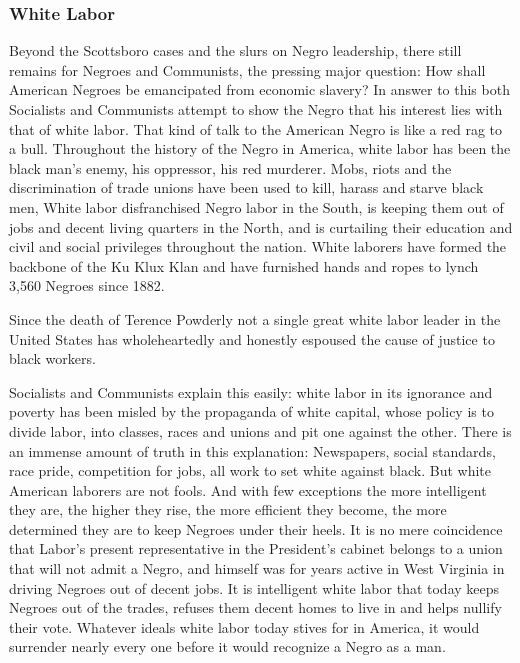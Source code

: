 \documentclass[letterpaper,10pt,english]{jupyterBook}
\begin{document}
\subsubsection{White Labor}
\label{\detokenize{Volumes/38/09/negro_and_communism:white-labor}}
\sphinxAtStartPar
Beyond the Scottsboro cases and the slurs on Negro leadership, there still remains for Negroes and Communists, the pressing major question: How shall American Negroes be emancipated from economic slavery? In answer to this both Socialists and Communists attempt to show the Negro that his interest lies with that of white labor. That kind of talk to the American Negro is like a red rag to a bull. Throughout the history of the Negro in America, white labor has been the black man’s enemy, his oppressor, his red murderer. Mobs, riots and the discrimination of trade unions have been used to kill, harass and starve black men, White labor disfranchised Negro labor in the South, is keeping them out of jobs and decent living quarters in the North, and is curtailing their education and civil and social privileges throughout the nation. White laborers have formed the backbone of the Ku Klux Klan and have furnished hands and ropes to lynch 3,560 Negroes since 1882.

\sphinxAtStartPar
Since the death of Terence Powderly not a single great white labor leader in the United States has wholeheartedly and honestly espoused the cause of justice to black workers.

\sphinxAtStartPar
Socialists and Communists explain this easily: white labor in its ignorance and poverty has been misled by the propaganda of white capital, whose policy is to divide labor, into classes, races and unions and pit one against the other. There is an immense amount of truth in this explanation: Newspapers, social standards, race pride, competition for jobs, all work to set white against black. But white American laborers are not fools. And with few exceptions the more intelligent they are, the higher they rise, the more efficient they become, the more determined they are to keep Negroes under their heels. It is no mere coincidence that Labor’s present representative in the President’s cabinet belongs to a union that will not admit a Negro, and himself was for years active in West Virginia in driving Negroes out of decent jobs. It is intelligent white labor that today keeps Negroes out of the trades, refuses them decent homes to live in and helps nullify their vote. Whatever ideals white labor today stives for in America, it would surrender nearly every one before it would recognize a Negro as a man.
\end{document}
